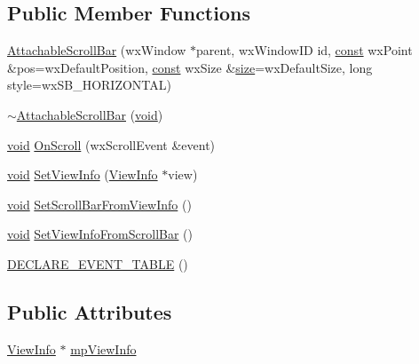\subsection*{Public Member Functions}
\begin{DoxyCompactItemize}
\item 
\hyperlink{class_attachable_scroll_bar_aff41b7b5971af0cd1e843fbc8cb8d50e}{Attachable\+Scroll\+Bar} (wx\+Window $\ast$parent, wx\+Window\+ID id, \hyperlink{getopt1_8c_a2c212835823e3c54a8ab6d95c652660e}{const} wx\+Point \&pos=wx\+Default\+Position, \hyperlink{getopt1_8c_a2c212835823e3c54a8ab6d95c652660e}{const} wx\+Size \&\hyperlink{group__lavu__mem_ga854352f53b148adc24983a58a1866d66}{size}=wx\+Default\+Size, long style=wx\+S\+B\+\_\+\+H\+O\+R\+I\+Z\+O\+N\+T\+AL)
\item 
\hyperlink{class_attachable_scroll_bar_a9cce80f3802c626a098b6de54973693b}{$\sim$\+Attachable\+Scroll\+Bar} (\hyperlink{sound_8c_ae35f5844602719cf66324f4de2a658b3}{void})
\item 
\hyperlink{sound_8c_ae35f5844602719cf66324f4de2a658b3}{void} \hyperlink{class_attachable_scroll_bar_af7be76e6dec01597c75098f5a4f97fb1}{On\+Scroll} (wx\+Scroll\+Event \&event)
\item 
\hyperlink{sound_8c_ae35f5844602719cf66324f4de2a658b3}{void} \hyperlink{class_attachable_scroll_bar_a925e6c5c5f100a8b7e5c49e524d8baf3}{Set\+View\+Info} (\hyperlink{class_view_info}{View\+Info} $\ast$view)
\item 
\hyperlink{sound_8c_ae35f5844602719cf66324f4de2a658b3}{void} \hyperlink{class_attachable_scroll_bar_ae337a63cfaa6b21af658d422a5f5b1ed}{Set\+Scroll\+Bar\+From\+View\+Info} ()
\item 
\hyperlink{sound_8c_ae35f5844602719cf66324f4de2a658b3}{void} \hyperlink{class_attachable_scroll_bar_a91eb811c512f229d07e98284a7b12a76}{Set\+View\+Info\+From\+Scroll\+Bar} ()
\item 
\hyperlink{class_attachable_scroll_bar_a3837f602601c728af33b2559c3e5db3e}{D\+E\+C\+L\+A\+R\+E\+\_\+\+E\+V\+E\+N\+T\+\_\+\+T\+A\+B\+LE} ()
\end{DoxyCompactItemize}
\subsection*{Public Attributes}
\begin{DoxyCompactItemize}
\item 
\hyperlink{class_view_info}{View\+Info} $\ast$ \hyperlink{class_attachable_scroll_bar_a88ac49bee9cea6f582c2b0d82c1c5f6a}{mp\+View\+Info}
\end{DoxyCompactItemize}



